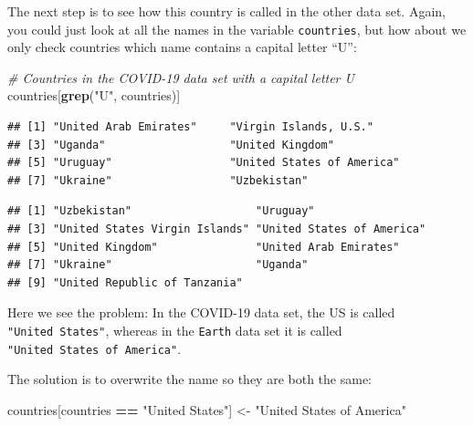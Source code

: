 \documentclass[
]{book}
\newenvironment{Shaded}{\begin{snugshade}}{\end{snugshade}}
\newcommand{\CommentTok}[1]{\textcolor[rgb]{0.56,0.35,0.01}{\textit{#1}}}
\newcommand{\FunctionTok}[1]{\textcolor[rgb]{0.13,0.29,0.53}{\textbf{#1}}}
\newcommand{\NormalTok}[1]{#1}
\newcommand{\OtherTok}[1]{\textcolor[rgb]{0.56,0.35,0.01}{#1}}
\newcommand{\SpecialCharTok}[1]{\textcolor[rgb]{0.81,0.36,0.00}{\textbf{#1}}}
\newcommand{\StringTok}[1]{\textcolor[rgb]{0.31,0.60,0.02}{#1}}
\begin{document}
The next step is to see how this country is called in the other data set. Again, you could just look at all the names in the variable \texttt{countries}, but how about we only check countries which name contains a capital letter ``U'':

\begin{Shaded}
\begin{Highlighting}[]
\CommentTok{\# Countries in the COVID{-}19 data set with a capital letter U}
\NormalTok{countries[}\FunctionTok{grep}\NormalTok{(}\StringTok{"U"}\NormalTok{, countries)]}
\end{Highlighting}
\end{Shaded}

\begin{verbatim}
## [1] "United Arab Emirates"     "Virgin Islands, U.S."    
## [3] "Uganda"                   "United Kingdom"          
## [5] "Uruguay"                  "United States of America"
## [7] "Ukraine"                  "Uzbekistan"
\end{verbatim}

\begin{Shaded}
\end{Shaded}

\begin{verbatim}
## [1] "Uzbekistan"                   "Uruguay"                     
## [3] "United States Virgin Islands" "United States of America"    
## [5] "United Kingdom"               "United Arab Emirates"        
## [7] "Ukraine"                      "Uganda"                      
## [9] "United Republic of Tanzania"
\end{verbatim}

Here we see the problem: In the COVID-19 data set, the US is called \texttt{"United\ States"}, whereas in the \texttt{Earth} data set it is called \texttt{"United\ States\ of\ America"}.

The solution is to overwrite the name so they are both the same:

\begin{Shaded}
\begin{Highlighting}[]
\NormalTok{countries[countries }\SpecialCharTok{==} \StringTok{"United States"}\NormalTok{] }\OtherTok{\textless{}{-}} \StringTok{"United States of America"}
\end{Highlighting}
\end{Shaded}
\end{document}
